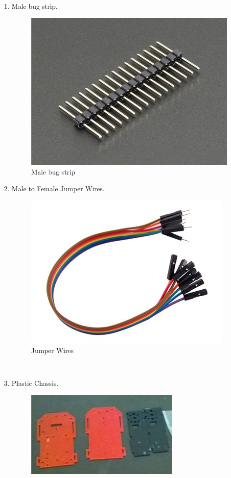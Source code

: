 \documentclass[a4paper,12pt,oneside]{book}
\begin{document}
\begin{itemize}
\begin{enumerate}
      \newpage
    \item Male bug strip.
    \begin{figure}[!h]
        \centering
        \includegraphics[scale=0.12]{mbug}
        \caption{Male bug strip}
      \end{figure}
    \item Male to Female Jumper Wires.
    \begin{figure}[!h]
        \centering
        \includegraphics[scale=0.45]{jumper}
        \caption{Jumper Wires}
      \end{figure}\\
    \item Plastic Chassis.\\
     \par
    \begin{figure}[!h]
        \centering
        \includegraphics[scale=0.75]{chasis}

\end{figure}
\end{enumerate}
\end{itemize}
\end{document}
